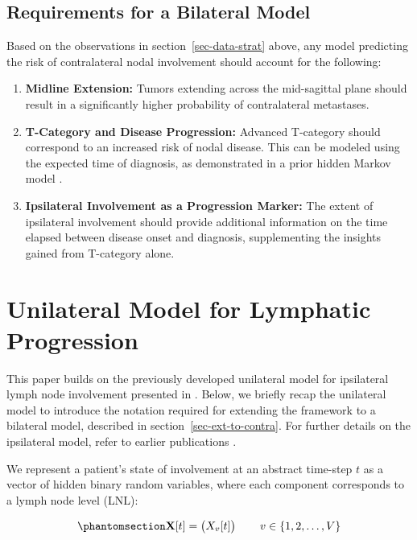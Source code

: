 \documentclass[
  sn-mathphys-num,
]{sn-jnl}
\providecommand{\tightlist}{%
  \setlength{\itemsep}{0pt}\setlength{\parskip}{0pt}}\usepackage{longtable,booktabs,array}
\begin{document}
\subsection{Requirements for a Bilateral Model}\label{sec-requirements}

Based on the observations in section~\ref{sec-data-strat} above, any
model predicting the risk of contralateral nodal involvement should
account for the following:

\begin{enumerate}
\def\labelenumi{\arabic{enumi}.}
\tightlist
\item
  \textbf{Midline Extension:} Tumors extending across the mid-sagittal
  plane should result in a significantly higher probability of
  contralateral metastases.
\item
  \textbf{T-Category and Disease Progression:} Advanced T-category
  should correspond to an increased risk of nodal disease. This can be
  modeled using the expected time of diagnosis, as demonstrated in a
  prior hidden Markov model \citep{ludwig_hidden_2021}.
\item
  \textbf{Ipsilateral Involvement as a Progression Marker:} The extent
  of ipsilateral involvement should provide additional information on
  the time elapsed between disease onset and diagnosis, supplementing
  the insights gained from T-category alone.
\end{enumerate}

\section{Unilateral Model for Lymphatic
Progression}\label{sec-unilateral}

This paper builds on the previously developed unilateral model for
ipsilateral lymph node involvement presented in
\citep{ludwig_modelling_2024}. Below, we briefly recap the unilateral
model to introduce the notation required for extending the framework to
a bilateral model, described in section~\ref{sec-ext-to-contra}. For
further details on the ipsilateral model, refer to earlier publications
\citep{ludwig_hidden_2021, ludwig_modelling_2024}.

We represent a patient's state of involvement at an abstract time-step
\(t\) as a vector of hidden binary random variables, where each
component corresponds to a lymph node level (LNL):

\begin{equation}\phantomsection\label{eq-state-def}{
\mathbf{X}[t] = \begin{pmatrix} X_v[t] \end{pmatrix} \qquad v \in \left\{ 1, 2, \ldots, V \right\}
}\end{equation}
\end{document}
